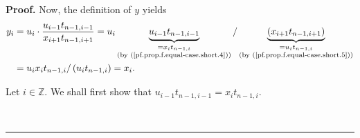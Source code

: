 \documentclass[numbers=enddot,12pt,final,onecolumn,notitlepage]{scrartcl}%
\theoremstyle{definition}
\newenvironment{proof}[1][Proof]{\noindent\textbf{#1.} }{\ \rule{0.5em}{0.5em}}
\newenvironment{verlong}{}{}
\newenvironment{vershort}{}{}
\begin{document}
\begin{proof}
\begin{vershort}
Now, the definition of $y$ yields%
\begin{align*}
y_{i}  &  =u_{i}\cdot\dfrac{u_{i-1}t_{n-1,i-1}}{x_{i+1}t_{n-1,i+1}}%
=u_{i}\underbrace{u_{i-1}t_{n-1,i-1}}_{\substack{=x_{i}t_{n-1,i}\\\text{(by
(\ref{pf.prop.f.equal-case.short.4}))}}}/\underbrace{\left(  x_{i+1}%
t_{n-1,i+1}\right)  }_{\substack{=u_{i}t_{n-1,i}\\\text{(by
(\ref{pf.prop.f.equal-case.short.5}))}}}\\
&  =u_{i}x_{i}t_{n-1,i}/\left(  u_{i}t_{n-1,i}\right)  =x_{i}.
\end{align*}

\end{vershort}

\begin{verlong}
Let $i\in\mathbb{Z}$. We shall first show that $u_{i-1}t_{n-1,i-1}%
=x_{i}t_{n-1,i}$.


\end{verlong}
\end{proof}
\end{document}
